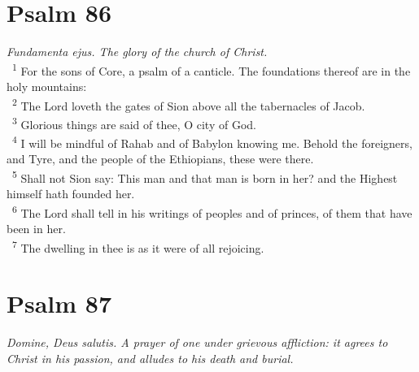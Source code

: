 \documentclass[a5paper,12pt]{article}
\begin{document}
\begin{multicols*}{2}
\section{Psalm 86}
\label{sec:orgeacb12c}
\emph{Fundamenta ejus. The glory of the church of Christ.}\\

~\textsuperscript{1} For the sons of Core, a psalm of a canticle. The foundations thereof are in the holy mountains:\\
~\textsuperscript{2} The Lord loveth the gates of Sion above all the tabernacles of Jacob.\\
~\textsuperscript{3} Glorious things are said of thee, O city of God.\\
~\textsuperscript{4} I will be mindful of Rahab and of Babylon knowing me. Behold the foreigners, and Tyre, and the people of the Ethiopians, these were there.\\
~\textsuperscript{5} Shall not Sion say: This man and that man is born in her? and the Highest himself hath founded her.\\
~\textsuperscript{6} The Lord shall tell in his writings of peoples and of princes, of them that have been in her.\\
~\textsuperscript{7} The dwelling in thee is as it were of all rejoicing.\\

\section{Psalm 87}
\label{sec:org3443334}
\emph{Domine, Deus salutis. A prayer of one under grievous affliction: it agrees to Christ in his passion, and alludes to his death and burial.}\\


\end{multicols*}
\end{document}
